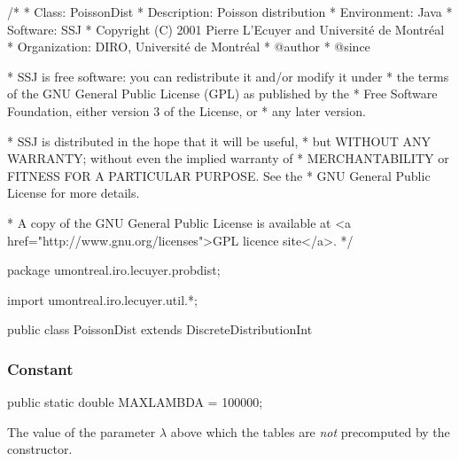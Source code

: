 \begin{code}
\begin{hide}
/*
 * Class:        PoissonDist
 * Description:  Poisson distribution
 * Environment:  Java
 * Software:     SSJ 
 * Copyright (C) 2001  Pierre L'Ecuyer and Université de Montréal
 * Organization: DIRO, Université de Montréal
 * @author       
 * @since

 * SSJ is free software: you can redistribute it and/or modify it under
 * the terms of the GNU General Public License (GPL) as published by the
 * Free Software Foundation, either version 3 of the License, or
 * any later version.

 * SSJ is distributed in the hope that it will be useful,
 * but WITHOUT ANY WARRANTY; without even the implied warranty of
 * MERCHANTABILITY or FITNESS FOR A PARTICULAR PURPOSE.  See the
 * GNU General Public License for more details.

 * A copy of the GNU General Public License is available at
   <a href="http://www.gnu.org/licenses">GPL licence site</a>.
 */
\end{hide}
package umontreal.iro.lecuyer.probdist;\begin{hide}
import umontreal.iro.lecuyer.util.*;\end{hide}

public class PoissonDist extends DiscreteDistributionInt\begin{hide} {

   private double lambda;
\end{hide}
\end{code}
\unmoved\begin{detailed}
\subsubsection* {Constant}

\begin{code}

   public static double MAXLAMBDA = 100000;
\end{code}
 \begin{tabb} The value of the parameter  $\lambda$ above which
  the tables are {\em not\/} precomputed by the constructor.
\end{tabb}
\end{detailed}

